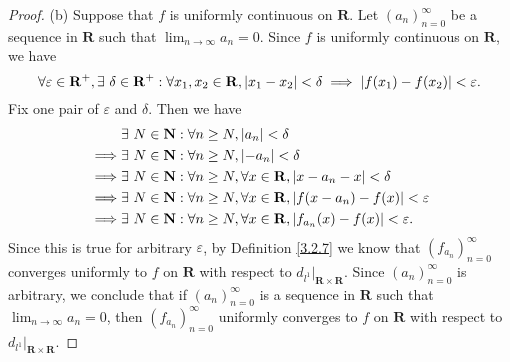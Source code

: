 \begin{proof}{(b)}
    Suppose that \(f\) is uniformly continuous on \(\mathbf{R}\).
    Let \((a_n)_{n = 0}^\infty\) be a sequence in \(\mathbf{R}\) such that \(\lim_{n \to \infty} a_n = 0\).
    Since \(f\) is uniformly continuous on \(\mathbf{R}\), we have
    \[
        \forall \varepsilon \in \mathbf{R}^+, \exists\ \delta \in \mathbf{R}^+ : \forall x_1, x_2 \in \mathbf{R}, \abs*{x_1 - x_2} < \delta \implies \abs*{f(x_1) - f(x_2)} < \varepsilon.
    \]
    Fix one pair of \(\varepsilon\) and \(\delta\).
    Then we have
    \begin{align*}
                 & \exists\ N \in \mathbf{N} : \forall n \geq N, \abs*{a_n} < \delta                                               \\
        \implies & \exists\ N \in \mathbf{N} : \forall n \geq N, \abs*{-a_n} < \delta                                              \\
        \implies & \exists\ N \in \mathbf{N} : \forall n \geq N, \forall x \in \mathbf{R}, \abs*{x - a_n - x} < \delta             \\
        \implies & \exists\ N \in \mathbf{N} : \forall n \geq N, \forall x \in \mathbf{R}, \abs*{f(x - a_n) - f(x)} < \varepsilon  \\
        \implies & \exists\ N \in \mathbf{N} : \forall n \geq N, \forall x \in \mathbf{R}, \abs*{f_{a_n}(x) - f(x)} < \varepsilon.
    \end{align*}
    Since this is true for arbitrary \(\varepsilon\), by Definition \ref{3.2.7} we know that \((f_{a_n})_{n = 0}^\infty\) converges uniformly to \(f\) on \(\mathbf{R}\) with respect to \(d_{l^1}|_{\mathbf{R} \times \mathbf{R}}\).
    Since \((a_n)_{n = 0}^\infty\) is arbitrary, we conclude that if \((a_n)_{n = 0}^\infty\) is a sequence in \(\mathbf{R}\) such that \(\lim_{n \to \infty} a_n = 0\), then \((f_{a_n})_{n = 0}^\infty\) uniformly converges to \(f\) on \(\mathbf{R}\) with respect to \(d_{l^1}|_{\mathbf{R} \times \mathbf{R}}\).


\end{proof}
